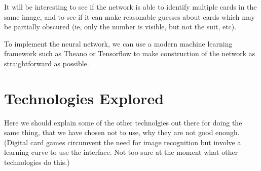 \documentclass{article}
\begin{document}
It will be interesting to see if the network is able to identify multiple cards in the same image, and to see if it can make reasonable guesses about cards which may be partially obscured (ie, only the number is visible, but not the suit, etc).

To implement the neural network, we can use a modern machine learning framework such as Theano or Tensorflow to make construction of the network as straightforward as possible.

\section{Technologies Explored}
Here we should explain some of the other technolgies out there for doing the same thing, that we have chosen not to use, why they are not good enough. (Digital card games circumvent the need for image recognition but involve a learning curve to use the interface. Not too sure at the moment what other technologies do this.)



\nocite{*}


\end{document}
